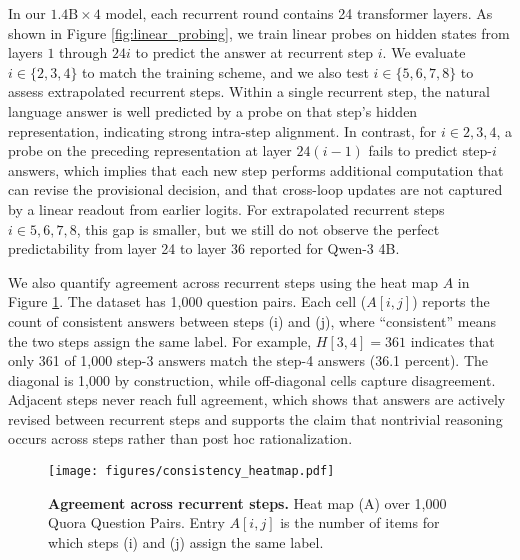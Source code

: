 \documentclass[]{bytedance_seed}
\newcommand{\1}{\mathbf{1}}
\newcommand{\tz}[1]{\textcolor{green}{[TZ: #1]}}
\begin{document}
In our $1.4\mathrm{B}\times4$ model, each recurrent round contains 24 transformer layers. As shown in Figure \ref{fig:linear_probing}, we train linear probes on hidden states from layers $1$ through $24i$ to predict the answer at recurrent step $i$. We evaluate $i\in\{2,3,4\}$ to match the training scheme, and we also test $i\in\{5,6,7,8\}$ to assess extrapolated recurrent steps. Within a single recurrent step, the natural language answer is well predicted by a probe on that step’s hidden representation, indicating strong intra-step alignment. In contrast, for $i\in{2,3,4}$, a probe on the preceding representation at layer $24(i-1)$ fails to predict step-$i$ answers, which implies that each new step performs additional computation that can revise the provisional decision, and that cross-loop updates are not captured by a linear readout from earlier logits. For extrapolated recurrent steps $i\in{5,6,7,8}$, this gap is smaller, but we still do not observe the perfect predictability from layer 24 to layer 36 reported for Qwen-3 4B.

We also quantify agreement across recurrent steps using the heat map $A$ in Figure \ref{fig:heatmap}. The dataset has 1,000 question pairs. Each cell ($A[i,j]$) reports the count of consistent answers between steps (i) and (j), where ``consistent” means the two steps assign the same label. For example, $H[3,4]=361$ indicates that only 361 of 1,000 step-3 answers match the step-4 answers (36.1 percent). The diagonal is 1,000 by construction, while off-diagonal cells capture disagreement. Adjacent steps never reach full agreement, which shows that answers are actively revised between recurrent steps and supports the claim that nontrivial reasoning occurs across steps rather than post hoc rationalization.



\begin{figure}[h]
    \centering
    \texttt{[image: figures/consistency\_heatmap.pdf]}
    \caption{\textbf{Agreement across recurrent steps.} Heat map (A) over 1,000 Quora Question Pairs. Entry $A[i,j]$ is the number of items for which steps (i) and (j) assign the same label.}
    \label{fig:heatmap}
\end{figure}



\end{document}
